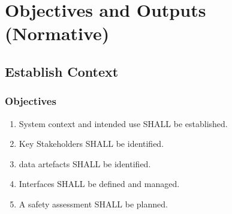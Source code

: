 %
%
\section{Objectives and Outputs (Normative)} \label{bkm:objectivesoutputs}


\subsection{Establish Context}
\subsubsection{Objectives}
\begin{enumerate}[label=\color{dsiwgAccentColour}{1-\arabic*}]
	\item System context and intended use SHALL be established.
	\item Key Stakeholders SHALL be identified.
	\item {}\Glspl{data artefact} SHALL be identified.
	\item Interfaces SHALL be defined and managed.
	\item A \gls{safety assessment} SHALL be planned.
\end{enumerate}

